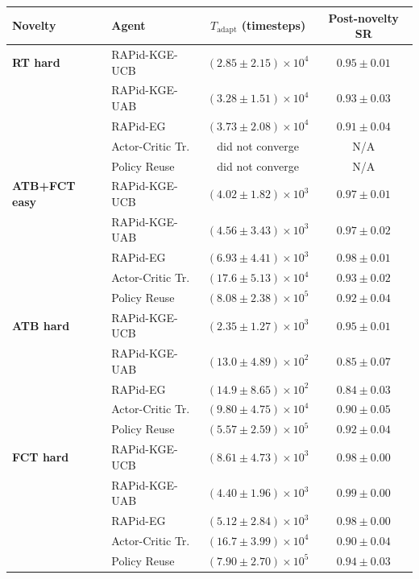 \begin{table}[htbp]
\footnotesize
\centering
\begin{tabular}{l l c c}
\toprule
Novelty & Agent & $T_\text{adapt}$ (timesteps) & Post-novelty SR \\
\midrule
\textbf{RT hard}
  & RAPid-KGE-UCB     & $(2.85 \pm 2.15) \times 10^4$ & $0.95 \pm 0.01$ \\
  & RAPid-KGE-UAB     & $(3.28 \pm 1.51) \times 10^4$ & $0.93 \pm 0.03$ \\
  & RAPid-EG          & $(3.73 \pm 2.08) \times 10^4$ & $0.91 \pm 0.04$ \\
  & Actor-Critic Tr.  & did not converge              & N/A \\
  & Policy Reuse      & did not converge              & N/A \\
\midrule
\textbf{ATB+FCT easy}
  & RAPid-KGE-UCB     & $(4.02 \pm 1.82) \times 10^3$ & $0.97 \pm 0.01$ \\
  & RAPid-KGE-UAB     & $(4.56 \pm 3.43) \times 10^3$ & $0.97 \pm 0.02$ \\
  & RAPid-EG          & $(6.93 \pm 4.41) \times 10^3$ & $0.98 \pm 0.01$ \\
  & Actor-Critic Tr.  & $(17.6 \pm 5.13) \times 10^4$ & $0.93 \pm 0.02$ \\
  & Policy Reuse      & $(8.08 \pm 2.38) \times 10^5$ & $0.92 \pm 0.04$ \\
\midrule
\textbf{ATB hard}
  & RAPid-KGE-UCB     & $(2.35 \pm 1.27) \times 10^3$ & $0.95 \pm 0.01$ \\
  & RAPid-KGE-UAB     & $(13.0 \pm 4.89) \times 10^2$ & $0.85 \pm 0.07$ \\
  & RAPid-EG          & $(14.9 \pm 8.65) \times 10^2$ & $0.84 \pm 0.03$ \\
  & Actor-Critic Tr.  & $(9.80 \pm 4.75) \times 10^4$ & $0.90 \pm 0.05$ \\
  & Policy Reuse      & $(5.57 \pm 2.59) \times 10^5$ & $0.92 \pm 0.04$ \\
\midrule
\textbf{FCT hard}
  & RAPid-KGE-UCB     & $(8.61 \pm 4.73) \times 10^3$ & $0.98 \pm 0.00$ \\
  & RAPid-KGE-UAB     & $(4.40 \pm 1.96) \times 10^3$ & $0.99 \pm 0.00$ \\
  & RAPid-EG          & $(5.12 \pm 2.84) \times 10^3$ & $0.98 \pm 0.00$ \\
  & Actor-Critic Tr.  & $(16.7 \pm 3.99) \times 10^4$ & $0.90 \pm 0.04$ \\
  & Policy Reuse      & $(7.90 \pm 2.70) \times 10^5$ & $0.94 \pm 0.03$ \\

\end{tabular}
\end{table}
